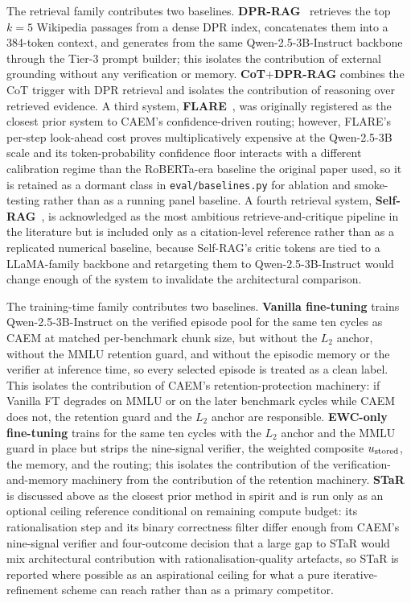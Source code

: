The retrieval family contributes two baselines. \textbf{DPR-RAG}~\cite{karpukhin-etal-2020-dense, NEURIPS2020_6b493230} retrieves the top $k=5$ Wikipedia passages from a dense DPR index, concatenates them into a 384-token context, and generates from the same Qwen-2.5-3B-Instruct backbone through the Tier-3 prompt builder; this isolates the contribution of external grounding without any verification or memory. \textbf{CoT$+$DPR-RAG} combines the CoT trigger with DPR retrieval and isolates the contribution of reasoning over retrieved evidence. A third system, \textbf{FLARE}~\cite{jiang-etal-2023-active}, was originally registered as the closest prior system to CAEM's confidence-driven routing; however, FLARE's per-step look-ahead cost proves multiplicatively expensive at the Qwen-2.5-3B scale and its token-probability confidence floor interacts with a different calibration regime than the RoBERTa-era baseline the original paper used, so it is retained as a dormant class in \texttt{eval/baselines.py} for ablation and smoke-testing rather than as a running panel baseline. A fourth retrieval system, \textbf{Self-RAG}~\cite{asai2024selfrag}, is acknowledged as the most ambitious retrieve-and-critique pipeline in the literature but is included only as a citation-level reference rather than as a replicated numerical baseline, because Self-RAG's critic tokens are tied to a LLaMA-family backbone and retargeting them to Qwen-2.5-3B-Instruct would change enough of the system to invalidate the architectural comparison.

The training-time family contributes two baselines. \textbf{Vanilla fine-tuning} trains Qwen-2.5-3B-Instruct on the verified episode pool for the same ten cycles as CAEM at matched per-benchmark chunk size, but without the $L_{2}$ anchor, without the MMLU retention guard, and without the episodic memory or the verifier at inference time, so every selected episode is treated as a clean label. This isolates the contribution of CAEM's retention-protection machinery: if Vanilla FT degrades on MMLU or on the later benchmark cycles while CAEM does not, the retention guard and the $L_{2}$ anchor are responsible. \textbf{EWC-only fine-tuning} trains for the same ten cycles with the $L_{2}$ anchor and the MMLU guard in place but strips the nine-signal verifier, the weighted composite $u_{\text{stored}}$, the memory, and the routing; this isolates the contribution of the verification-and-memory machinery from the contribution of the retention machinery. \textbf{STaR}~\cite{NEURIPS2022_639a9a17} is discussed above as the closest prior method in spirit and is run only as an optional ceiling reference conditional on remaining compute budget: its rationalisation step and its binary correctness filter differ enough from CAEM's nine-signal verifier and four-outcome decision that a large gap to STaR would mix architectural contribution with rationalisation-quality artefacts, so STaR is reported where possible as an aspirational ceiling for what a pure iterative-refinement scheme can reach rather than as a primary competitor.

